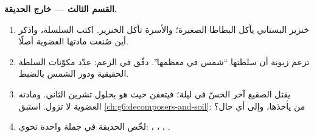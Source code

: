 \begin{problem}
\medskip\noindent\textbf{القسم الثالث --- خارج الحديقة.}
\begin{enumerate}[resume]
  \item خنزير البستاني يأكل البطاطا الصغيرة؛ والأسرة تأكل
        الخنزير. اكتب السلسلة، واذكر أين صُنعت مادتها العضوية
        أصلًا.
  \item تزعم زبونة أن سلطتها ``شمس في معظمها''. دقّق في الزعم:
        عدّد مكوّنات  السلطة الحقيقية ودور الشمس بالضبط.
  \item يقتل الصقيع آخر الخسّ في ليلة؛ فيتعفن حيث هو بحلول تشرين
        الثاني. ومادته العضوية لا تزول. استبق
        \cref{ch:g6:decomposers-and-soil}: من يأخذها، وإلى أي
        حال؟
  \item لخّص الحديقة في جملة واحدة تحوي: ، ، ، .
\end{enumerate}
\end{problem}
